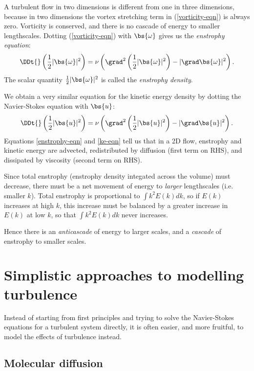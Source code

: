A turbulent flow in two dimensions is different from one in three dimensions, because in two dimensions the vortex stretching term in (\ref{vorticity-eqn}) is always zero. Vorticity is conserved, and there is no cascade of energy to smaller lengthscales. Dotting (\ref{vorticity-eqn}) with
$\bs{\omega}$ gives us the \textit{enstrophy equation}:
\begin{equation}
    \DDt{}\left(\frac{1}{2}|\bs{\omega}|^2\right) 
    = \nu\left(\grad^2 \left( \frac{1}{2}|\bs{\omega}|^2 \right) - |\grad\bs{\omega}|^2\right).
 \label{enstrophy-eqn}
\end{equation}
The scalar quantity $\frac{1}{2}|\bs{\omega}|^2$ is called the \textit{enstrophy density}. 

We obtain a very similar equation for the kinetic energy density by dotting the
Navier-Stokes equation with $\bs{u}$:
\begin{equation}
    \DDt{}\left(\frac{1}{2}|\bs{u}|^2\right) 
    = \nu\left(\grad^2 \left( \frac{1}{2}|\bs{u}|^2 \right) - |\grad\bs{u}|^2\right).
 \label{ke-eqn}
\end{equation}
Equations \ref{enstrophy-eqn} and \ref{ke-eqn} tell us that in a 2D flow, enstrophy and kinetic energy are advected, redistributed by diffusion (first term on RHS), and dissipated by viscosity (second term on RHS).

Since total enstrophy (enstrophy density integated across the volume) must
decrease, there must be a net movement of energy to \textit{larger} lengthscales
(i.e.  smaller $k$). Total enstrophy is proportional to $\int k^2E(k) dk$, so if
$E(k)$ increases at high $k$, this increase must be balanced by a greater
increase in $E(k)$ at low $k$, so that $\int k^2E(k) dk$ never increases.

Hence there is an \textit{anticascade} of energy to larger scales, and a
\textit{cascade} of enstrophy to smaller scales.

\section{Simplistic approaches to modelling turbulence}

Instead of starting from first principles and trying to solve the Navier-Stokes equations for a turbulent system directly, it is often easier, and more fruitful, to model the effects of turbulence instead.

\subsection{Molecular diffusion}

